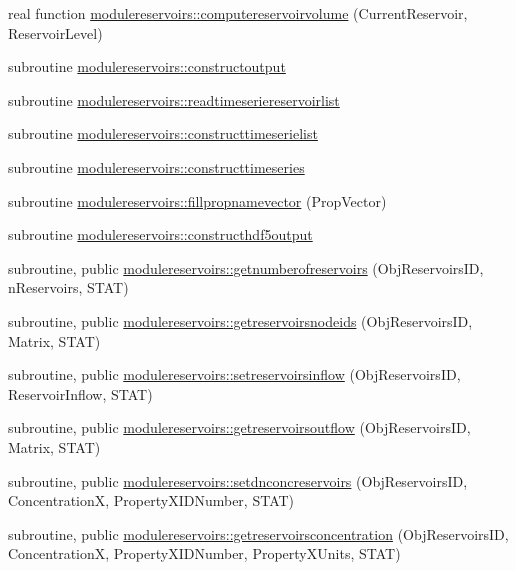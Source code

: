 \begin{DoxyCompactItemize}
\item 
real function \mbox{\hyperlink{namespacemodulereservoirs_a5482b1f1fc7530ca5302b5dc3352566f}{modulereservoirs\+::computereservoirvolume}} (Current\+Reservoir, Reservoir\+Level)
\item 
subroutine \mbox{\hyperlink{namespacemodulereservoirs_a43db2f4830b1c886cf024e34a2682edb}{modulereservoirs\+::constructoutput}}
\item 
subroutine \mbox{\hyperlink{namespacemodulereservoirs_a24436967478aa33f4288a6cec5b2bb59}{modulereservoirs\+::readtimeseriereservoirlist}}
\item 
subroutine \mbox{\hyperlink{namespacemodulereservoirs_a8922a19edc4b29fdfa9899431548dabc}{modulereservoirs\+::constructtimeserielist}}
\item 
subroutine \mbox{\hyperlink{namespacemodulereservoirs_a8cfdd387909b50145910c908f6e129f0}{modulereservoirs\+::constructtimeseries}}
\item 
subroutine \mbox{\hyperlink{namespacemodulereservoirs_a4297360b11f2cc348b2bb6524d4307b9}{modulereservoirs\+::fillpropnamevector}} (Prop\+Vector)
\item 
subroutine \mbox{\hyperlink{namespacemodulereservoirs_aa1585e14b10abec0e0a86d6b4674be9c}{modulereservoirs\+::constructhdf5output}}
\item 
subroutine, public \mbox{\hyperlink{namespacemodulereservoirs_a6c97c189244107e76016a8e045715d94}{modulereservoirs\+::getnumberofreservoirs}} (Obj\+Reservoirs\+ID, n\+Reservoirs, S\+T\+AT)
\item 
subroutine, public \mbox{\hyperlink{namespacemodulereservoirs_a1af4820153560697135a4b5289ffefb9}{modulereservoirs\+::getreservoirsnodeids}} (Obj\+Reservoirs\+ID, Matrix, S\+T\+AT)
\item 
subroutine, public \mbox{\hyperlink{namespacemodulereservoirs_af7840621e7e8765fc75f7a8c81f0b054}{modulereservoirs\+::setreservoirsinflow}} (Obj\+Reservoirs\+ID, Reservoir\+Inflow, S\+T\+AT)
\item 
subroutine, public \mbox{\hyperlink{namespacemodulereservoirs_a92177000a842b34a96a2edc6b49e3128}{modulereservoirs\+::getreservoirsoutflow}} (Obj\+Reservoirs\+ID, Matrix, S\+T\+AT)
\item 
subroutine, public \mbox{\hyperlink{namespacemodulereservoirs_a947f8bf80536f49287e59c0f5d008f17}{modulereservoirs\+::setdnconcreservoirs}} (Obj\+Reservoirs\+ID, ConcentrationX, Property\+X\+I\+D\+Number, S\+T\+AT)
\item 
subroutine, public \mbox{\hyperlink{namespacemodulereservoirs_af97fb114c425ea04bf826d452e6d075f}{modulereservoirs\+::getreservoirsconcentration}} (Obj\+Reservoirs\+ID, ConcentrationX, Property\+X\+I\+D\+Number, Property\+X\+Units, S\+T\+AT)

\end{DoxyCompactItemize}

